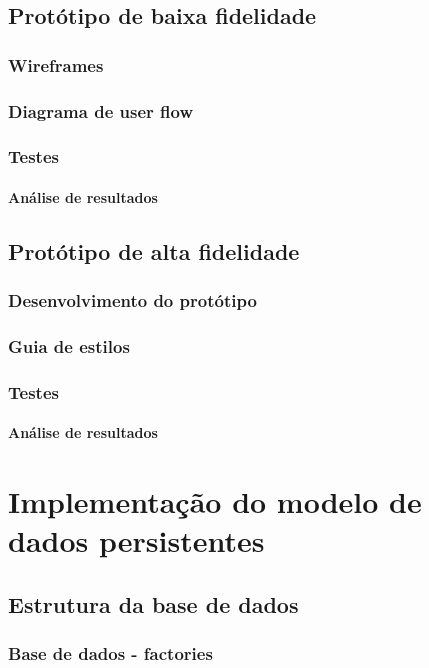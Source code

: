 \documentclass[11pt, twoside]{report}
\begin{document}
	\section{Protótipo de baixa fidelidade}
	\subsection{Wireframes}
	\subsection{Diagrama de user flow}
	\subsection{Testes}
	\subsubsection{Análise de resultados}
	
	\section{Protótipo de alta fidelidade}
	\subsection{Desenvolvimento do protótipo}
	\subsection{Guia de estilos}
	\subsection{Testes}
	\subsubsection{Análise de resultados}
	
	\chapter{Implementação do modelo de dados persistentes}
	\section{Estrutura da base de dados}
	\subsection{Base de dados - factories}
\end{document}
